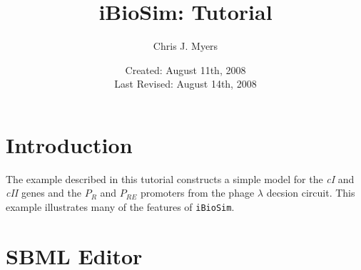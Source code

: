 \documentclass[titlepage,11pt]{article}
\title{iBioSim: Tutorial}
\author{Chris J. Myers}
\date{Created: August 11th, 2008\\
  Last Revised: August 14th, 2008
}
\begin{document}
\maketitle

  
\tableofcontents

\clearpage
  

\section{Introduction}

The example described in this tutorial constructs a simple model for
the \emph{cI} and \emph{cII} genes and the $P_R$ and $P_{RE}$
promoters from the phage $\lambda$ decsion circuit.  This example
illustrates many of the features of {\tt iBioSim}.


\section{SBML Editor}
\end{document}
